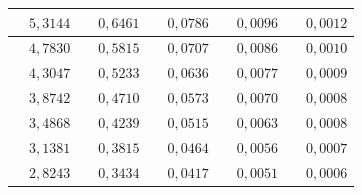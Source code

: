 \begin{table}[H]
\begin{tabular}{|c|c|c|c|c|c|c|c|c|c|}
\hline
\cellcolor{destacado}{\bfseries\boldmath $7$} & \cellcolor{destacado}$5{,}3144$ & \cellcolor{iteracion}{\bfseries\boldmath $27$} & $0{,}6461$ & \cellcolor{iteracion}{\bfseries\boldmath $47$} & $0{,}0786$ & \cellcolor{iteracion}{\bfseries\boldmath $67$} & $0{,}0096$ & \cellcolor{iteracion}{\bfseries\boldmath $87$} & $0{,}0012$ \\
\hline
\cellcolor{iteracion}{\bfseries\boldmath $8$} & \cellcolor{cebra}$4{,}7830$ & \cellcolor{destacado}{\bfseries\boldmath $28$} & \cellcolor{destacado}$0{,}5815$ & \cellcolor{iteracion}{\bfseries\boldmath $48$} & \cellcolor{cebra}$0{,}0707$ & \cellcolor{iteracion}{\bfseries\boldmath $68$} & \cellcolor{cebra}$0{,}0086$ & \cellcolor{iteracion}{\bfseries\boldmath $88$} & \cellcolor{cebra}$0{,}0010$ \\
\hline
\cellcolor{iteracion}{\bfseries\boldmath $9$} & $4{,}3047$ & \cellcolor{iteracion}{\bfseries\boldmath $29$} & $0{,}5233$ & \cellcolor{iteracion}{\bfseries\boldmath $49$} & $0{,}0636$ & \cellcolor{iteracion}{\bfseries\boldmath $69$} & $0{,}0077$ & \cellcolor{iteracion}{\bfseries\boldmath $89$} & $0{,}0009$ \\
\hline
\cellcolor{iteracion}{\bfseries\boldmath $10$} & \cellcolor{cebra}$3{,}8742$ & \cellcolor{iteracion}{\bfseries\boldmath $30$} & \cellcolor{cebra}$0{,}4710$ & \cellcolor{iteracion}{\bfseries\boldmath $50$} & \cellcolor{cebra}$0{,}0573$ & \cellcolor{iteracion}{\bfseries\boldmath $70$} & \cellcolor{cebra}$0{,}0070$ & \cellcolor{iteracion}{\bfseries\boldmath $90$} & \cellcolor{cebra}$0{,}0008$ \\
\hline
\cellcolor{iteracion}{\bfseries\boldmath $11$} & $3{,}4868$ & \cellcolor{iteracion}{\bfseries\boldmath $31$} & $0{,}4239$ & \cellcolor{iteracion}{\bfseries\boldmath $51$} & $0{,}0515$ & \cellcolor{iteracion}{\bfseries\boldmath $71$} & $0{,}0063$ & \cellcolor{iteracion}{\bfseries\boldmath $91$} & $0{,}0008$ \\
\hline
\cellcolor{destacado}{\bfseries\boldmath $12$} & \cellcolor{destacado}$3{,}1381$ & \cellcolor{iteracion}{\bfseries\boldmath $32$} & \cellcolor{cebra}$0{,}3815$ & \cellcolor{iteracion}{\bfseries\boldmath $52$} & \cellcolor{cebra}$0{,}0464$ & \cellcolor{iteracion}{\bfseries\boldmath $72$} & \cellcolor{cebra}$0{,}0056$ & \cellcolor{iteracion}{\bfseries\boldmath $92$} & \cellcolor{cebra}$0{,}0007$ \\
\hline
\cellcolor{iteracion}{\bfseries\boldmath $13$} & $2{,}8243$ & \cellcolor{iteracion}{\bfseries\boldmath $33$} & $0{,}3434$ & \cellcolor{iteracion}{\bfseries\boldmath $53$} & $0{,}0417$ & \cellcolor{iteracion}{\bfseries\boldmath $73$} & $0{,}0051$ & \cellcolor{iteracion}{\bfseries\boldmath $93$} & $0{,}0006$ \\

\end{tabular}
\end{table}
